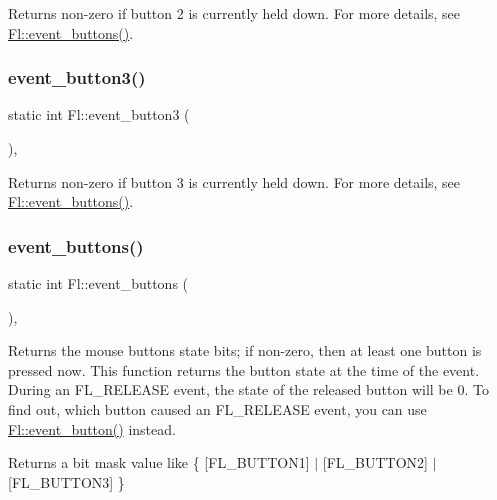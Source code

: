 Returns non-\/zero if button 2 is currently held down. For more details, see \hyperlink{group__fl__events_gaee06c25589974fafb1c8df8d0e2c7c80}{Fl\+::event\+\_\+buttons()}. \mbox{\label{group__fl__events_ga70f54fbed74f801495575939dc787361}} 
\subsubsection{\texorpdfstring{event\+\_\+button3()}{event\_button3()}}
{\footnotesize\ttfamily static int Fl\+::event\+\_\+button3 (\begin{DoxyParamCaption}{ }\end{DoxyParamCaption})\hspace{0.3cm}{\ttfamily [inline]}, {\ttfamily [static]}}

Returns non-\/zero if button 3 is currently held down. For more details, see \hyperlink{group__fl__events_gaee06c25589974fafb1c8df8d0e2c7c80}{Fl\+::event\+\_\+buttons()}. \mbox{\label{group__fl__events_gaee06c25589974fafb1c8df8d0e2c7c80}} 
\subsubsection{\texorpdfstring{event\+\_\+buttons()}{event\_buttons()}}
{\footnotesize\ttfamily static int Fl\+::event\+\_\+buttons (\begin{DoxyParamCaption}{ }\end{DoxyParamCaption})\hspace{0.3cm}{\ttfamily [inline]}, {\ttfamily [static]}}

Returns the mouse buttons state bits; if non-\/zero, then at least one button is pressed now. This function returns the button state at the time of the event. During an F\+L\+\_\+\+R\+E\+L\+E\+A\+SE event, the state of the released button will be 0. To find out, which button caused an F\+L\+\_\+\+R\+E\+L\+E\+A\+SE event, you can use \hyperlink{group__fl__events_ga7ae6d99ceb1a2afb8a1dc4455ac941cd}{Fl\+::event\+\_\+button()} instead. \begin{DoxyReturn}{Returns}
a bit mask value like \{ \mbox{[}F\+L\+\_\+\+B\+U\+T\+T\+O\+N1\mbox{]} $\vert$ \mbox{[}F\+L\+\_\+\+B\+U\+T\+T\+O\+N2\mbox{]} $\vert$ \mbox{[}F\+L\+\_\+\+B\+U\+T\+T\+O\+N3\mbox{]} \} 
\end{DoxyReturn}
\mbox{\label{group__fl__events_gafa31b53b34bd43ee107806a3bbc640d1}} 
